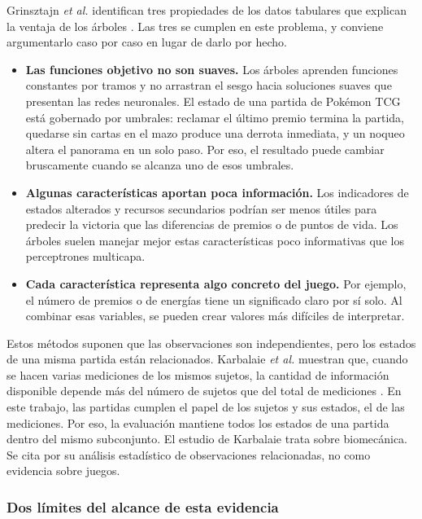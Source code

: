 Grinsztajn \textit{et al.} identifican tres propiedades de los datos
tabulares que explican la ventaja de los árboles
\cite{grinsztajn_trees_2022}. Las tres se cumplen en este problema, y
conviene argumentarlo caso por caso en lugar de darlo por hecho.

\begin{itemize}
  \item \textbf{Las funciones objetivo no son suaves.} Los árboles aprenden
        funciones constantes por tramos y no arrastran el sesgo hacia
        soluciones suaves que presentan las redes neuronales. El estado de
        una partida de Pok\'emon TCG está gobernado por umbrales:
        reclamar el último premio termina la partida, quedarse sin cartas en
        el mazo produce una derrota inmediata, y un noqueo altera el
        panorama en un solo paso. Por eso, el resultado puede cambiar
        bruscamente cuando se alcanza uno de esos umbrales.
  \item \textbf{Algunas características aportan poca información.} Los
        indicadores de estados alterados y recursos secundarios podrían ser
        menos útiles para predecir la victoria que las diferencias de premios
        o de puntos de vida. Los árboles suelen manejar mejor estas
        características poco informativas que los perceptrones multicapa.
  \item \textbf{Cada característica representa algo concreto del juego.}
        Por ejemplo, el número de premios o de energías tiene un significado
        claro por sí solo. Al combinar esas variables, se pueden crear valores
        más difíciles de interpretar.
\end{itemize}

Estos métodos suponen que las observaciones son independientes, pero los
estados de una misma partida están relacionados. Karbalaie
\textit{et al.} muestran que, cuando se hacen varias mediciones de los
mismos sujetos, la cantidad de información disponible depende más del número
de sujetos que del total de mediciones
\cite{karbalaie_participantaware_2026}. En este trabajo, las partidas
cumplen el papel de los sujetos y sus estados, el de las mediciones. Por eso,
la evaluación mantiene todos los estados de una partida dentro del mismo
subconjunto. El estudio de Karbalaie trata sobre biomecánica. Se cita por su
análisis estadístico de observaciones relacionadas, no como evidencia sobre
juegos.

\subsubsection{Dos límites del alcance de esta evidencia}

